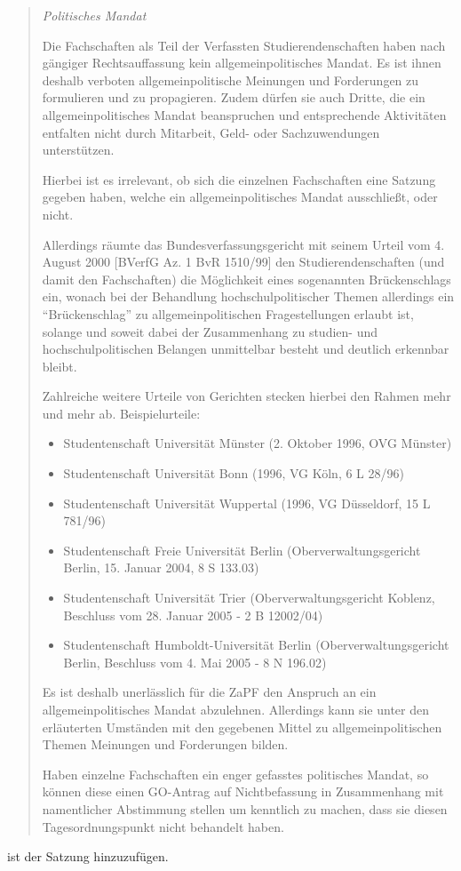 \documentclass[draft,10pt,oneside]{scrartcl}
\begin{document}
\begin{quote}
\emph{Politisches Mandat}

Die Fachschaften als Teil der Verfassten Studierendenschaften haben nach
gängiger Rechtsauffassung kein allgemeinpolitisches Mandat. Es ist ihnen deshalb
verboten allgemeinpolitische Meinungen und Forderungen zu formulieren und zu
propagieren. Zudem dürfen sie auch Dritte, die ein allgemeinpolitisches Mandat
beanspruchen und entsprechende Aktivitäten entfalten nicht durch Mitarbeit,
Geld- oder Sachzuwendungen unterstützen.

Hierbei ist es irrelevant, ob sich die einzelnen Fachschaften eine Satzung
gegeben haben, welche ein allgemeinpolitisches Mandat ausschließt, oder nicht.

Allerdings räumte das Bundesverfassungsgericht mit seinem Urteil vom 4. August
2000 [BVerfG Az. 1 BvR 1510/99] den Studierendenschaften (und damit den
Fachschaften) die Möglichkeit eines sogenannten Brückenschlags ein, wonach bei
der Behandlung hochschulpolitischer Themen allerdings ein ``Brückenschlag'' zu
allgemeinpolitischen Fragestellungen erlaubt ist, solange und soweit dabei der
Zusammenhang zu studien- und hochschulpolitischen Belangen unmittelbar besteht
und deutlich erkennbar bleibt.

Zahlreiche weitere Urteile von Gerichten stecken hierbei den Rahmen mehr und
mehr ab. Beispielurteile:

\begin{itemize}
\item Studentenschaft Universität Münster (2. Oktober 1996, OVG Münster)
\item Studentenschaft Universität Bonn (1996, VG Köln, 6 L 28/96)
\item Studentenschaft Universität Wuppertal (1996, VG Düsseldorf, 15 L 781/96)
\item Studentenschaft Freie Universität Berlin (Oberverwaltungsgericht
  Berlin, 15. Januar 2004, 8 S 133.03)
\item Studentenschaft Universität Trier (Oberverwaltungsgericht Koblenz,
  Beschluss vom 28. Januar 2005 - 2 B 12002/04)
\item Studentenschaft Humboldt-Universität Berlin (Oberverwaltungsgericht
  Berlin, Beschluss vom 4. Mai 2005 - 8 N 196.02)
\end{itemize}

Es ist deshalb unerlässlich für die ZaPF den Anspruch an ein
allgemeinpolitisches Mandat abzulehnen. Allerdings kann sie unter den
erläuterten Umständen mit den gegebenen Mittel zu allgemeinpolitischen Themen
Meinungen und Forderungen bilden.

Haben einzelne Fachschaften ein enger gefasstes politisches Mandat, so können
diese einen GO-Antrag auf Nichtbefassung in Zusammenhang mit namentlicher
Abstimmung stellen um kenntlich zu machen, dass sie diesen Tagesordnungspunkt
nicht behandelt haben.
\end{quote}
ist der Satzung hinzuzufügen.
\end{document}
